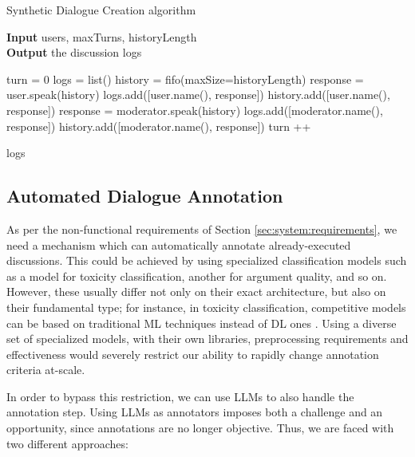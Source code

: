 \begin{algorithm}
	\caption{Synthetic Dialogue Creation algorithm} 
	\label{al::dialogue-creation}
	\hspace*{\algorithmicindent} \textbf{Input} users, maxTurns, historyLength\\
	\hspace*{\algorithmicindent} \textbf{Output} the discussion logs
	\begin{algorithmic}[1]	
		\State turn = 0
		\State logs = list()
		\State history = fifo(maxSize=historyLength)
		\State 
		\State response = user.speak(history)
		\State logs.add([user.name(), response])
		\State history.add([user.name(), response])
		\State
		\State response = moderator.speak(history)
		\State logs.add([moderator.name(), response])
		\State history.add([moderator.name(), response])
		\EndFor
		\State turn ++
		\EndWhile
		
		\State \Return logs
		
	\end{algorithmic} 
\end{algorithm}



\subsection{Automated Dialogue Annotation}
\label{ssec:system:annotation}

As per the non-functional requirements of Section \ref{sec:system:requirements}, we need a mechanism which can automatically annotate already-executed discussions. This could be achieved by using specialized classification models such as a model for toxicity classification, another for argument quality, and so on. However, these usually differ not only on their exact architecture, but also on their fundamental type; for instance, in toxicity classification, competitive models can be based on traditional \ac{ML} techniques instead of \ac{DL} ones \cite{anjum2024hate}. Using a diverse set of specialized models, with their own libraries, preprocessing requirements and effectiveness would severely restrict our ability to rapidly change annotation criteria at-scale. 

In order to bypass this restriction, we can use LLMs to also handle the annotation step. Using LLMs as annotators imposes both a challenge and an opportunity, since annotations are no longer objective. Thus, we are faced with two different approaches:

